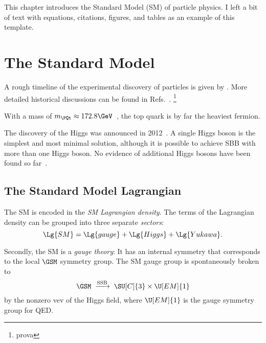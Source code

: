 

\label{sec:SM}

This chapter introduces the Standard Model (SM) of particle physics.
I left a bit of text with equations, citations, figures, and tables as an example of this template.


\section{The Standard Model}

A rough timeline of the experimental discovery of particles is given by .
More detailed historical discussions can be found in Refs.~\cite{particle_physics_history_50s,particle_physics_history_60s,particle_physics_Griffiths}.
\footnote{prova}


With a mass of $m_\PQt\approx172.8\GeV$~\cite[p.~32]{PDG_2022}, the top quark is by far the heaviest fermion.

The discovery of the Higgs was announced in 2012~\cite{Higgs_discovery_2012_CMS,Higgs_discovery_2012_ATLAS,Higgs_discovery_2013_CMS,Higgs_mass_2015_combined}. A single Higgs boson is the simplest and most minimal solution, although it is possible to achieve SBB with more than one Higgs boson. No evidence of additional Higgs bosons have been found so far~\cite{Higgs_extensions_LHC_2021}.



\subsection{The Standard Model Lagrangian}
The SM is encoded in the \emph{SM Lagrangian density}.
The terms of the Lagrangian density can be grouped into three separate \emph{sectors}:
\begin{equation}
  \Lg{SM} = \Lg{gauge} + \Lg{Higgs} + \Lg{Yukawa}.
\end{equation}

Secondly, the SM is a \emph{gauge theory}: It has an internal symmetry that corresponds to the local $\GSM$ symmetry group.
The SM gauge group is spontaneously broken to
\begin{equation}
  \GSM \;\xrightarrow{\mathrm{SSB}}\; \SU[C]{3}\times\U[EM]{1}
\end{equation}
by the nonzero vev of the Higgs field, where $\U[EM]{1}$ is the gauge symmetry group for QED.


